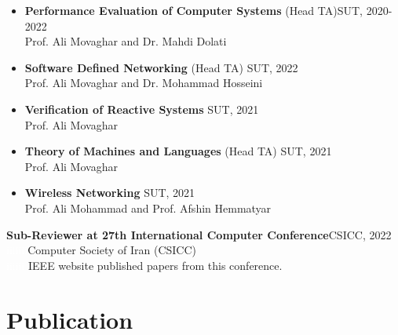 \documentclass[11pt]{article}
\begin{document}
\begin{itemize}
	


	\item \textbf{Performance Evaluation of Computer Systems}  (Head TA)\hfill SUT, 2020-2022
		\\ Prof. Ali Movaghar and Dr. Mahdi Dolati \vspace{-2mm} \href{https://scholar.google.com/citations?user=b7A2CXYAAAAJ&hl=en&oi=ao}{\small \faExternalLink}
	\item \textbf{Software Defined Networking} (Head TA) \hfill SUT, 2022
		\\ Prof. Ali Movaghar and Dr. Mohammad Hosseini \vspace{-2mm} \href{https://scholar.google.com/citations?user=iRO-DVoAAAAJ&hl=en&oi=ao}{\small \faExternalLink}
	\item \textbf{Verification of Reactive Systems} \hfill SUT, 2021
		\\ Prof. Ali Movaghar \vspace{-2mm}
			\item \textbf{Theory of Machines and Languages} (Head TA) \hfill SUT, 2021
		\\ Prof. Ali Movaghar \vspace{-2mm}
			\item \textbf{Wireless Networking} \hfill SUT, 2021
	\\ Prof. Ali Mohammad and Prof. Afshin Hemmatyar \vspace{-2mm} \href{https://scholar.google.com/citations?user=wob0AskAAAAJ&hl=en&oi=ao}{\small \faExternalLink}


		

\end{itemize}

\hspace{-7mm}\textbf{Sub-Reviewer at 27th International Computer Conference}\hfill CSICC, 2022 \\
  \textcolor{white}{iiiiiii}Computer Society of Iran (CSICC) \href{http://csi.org.ir/csicc2022/index-2.html}{\small \faExternalLink}\\ \textcolor{white}{iiiiii} IEEE website published papers from this conference. \href{https://ieeexplore.ieee.org/xpl/conhome/9780464/proceeding}{\small \faExternalLink}
  
  
  \section {Publication}
  
\end{document}
